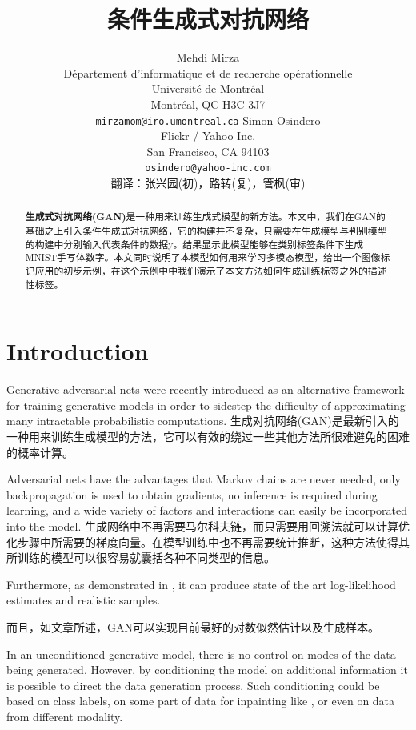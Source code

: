 \documentclass{article} %
\title{条件生成式对抗网络}
\author{
Mehdi Mirza \\
D\'epartement d'informatique et de recherche op\'erationnelle\\
Universit\'e de Montr\'eal\\
Montr\'eal, QC H3C 3J7 \\
\texttt{mirzamom@iro.umontreal.ca}
\AND
Simon Osindero \\
Flickr / Yahoo Inc. \\
San Francisco, CA 94103 \\
\texttt{osindero@yahoo-inc.com} \\
翻译：张兴园(初)，路转(复)，管枫(审)\\
}
\begin{document}
\maketitle

\begin{abstract}
\textbf{生成式对抗网络(GAN)}\cite{Goodfellow-et-al-NIPS2014-small}是一种用来训练生成式模型的新方法。本文中，我们在GAN的基础之上引入条件生成式对抗网络，它的构建并不复杂，只需要在生成模型与判别模型的构建中分别输入代表条件的数据y。结果显示此模型能够在类别标签条件下生成MNIST手写体数字。本文同时说明了本模型如何用来学习多模态模型，给出一个图像标记应用的初步示例，在这个示例中中我们演示了本文方法如何生成训练标签之外的描述性标签。
\end{abstract}

\section{Introduction}

Generative adversarial nets were recently introduced as an alternative framework for training
generative models in order to sidestep the difficulty of approximating many intractable probabilistic
computations.
生成对抗网络(GAN)是最新引入的一种用来训练生成模型的方法，它可以有效的绕过一些其他方法所很难避免的困难的概率计算。

Adversarial nets have the advantages that Markov chains
are never needed, only backpropagation is used to obtain gradients,
no inference is required during learning,
and a wide variety of factors and interactions can easily be incorporated into the model.
生成网络中不再需要马尔科夫链，而只需要用回溯法就可以计算优化步骤中所需要的梯度向量。在模型训练中也不再需要统计推断，这种方法使得其所训练的模型可以很容易就囊括各种不同类型的信息。

Furthermore, as demonstrated in \cite{Goodfellow-et-al-NIPS2014-small},
it can produce state of the art log-likelihood estimates and realistic samples.

而且，如文章\cite{Goodfellow-et-al-NIPS2014-small}所述，GAN可以实现目前最好的对数似然估计以及生成样本。

In an unconditioned generative model, there is no control on modes of the data being generated.
However, by conditioning the model on additional information it is possible to direct the data
generation process. Such conditioning could be based on class labels, on some part of data
for inpainting like \cite{goodfellow2013multi}, or even on data from different modality.
\end{document}
